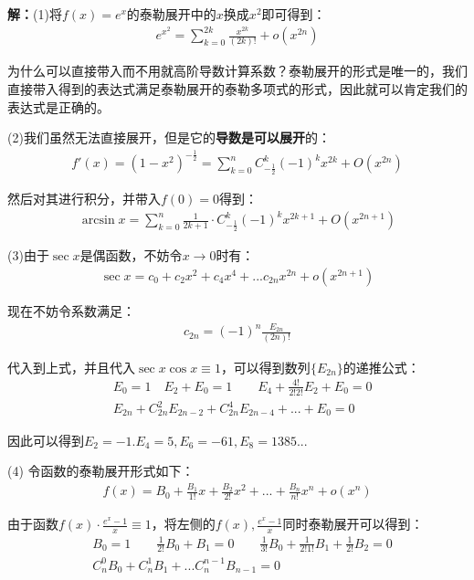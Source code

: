 \documentclass{ctexart}
\let\oldtextbf\textbf %
\renewcommand{\textbf}[1]{\textcolor{btex}{\oldtextbf{#1}}} %
\begin{document}
\textbf{解：}(1)将$f(x)=e^x$的泰勒展开中的$x$换成$x^2$即可得到：
\begin{align*}
    e^{x^2}=\sum_{k=0}^{2k}\frac{x^{2k}}{(2k)!}+o(x^{2n})
\end{align*}

为什么可以直接带入而不用就高阶导数计算系数？泰勒展开的形式是唯一的，我们直接带入得到的表达式满足泰勒展开的泰勒多项式的形式，因此就可以肯定我们的表达式是正确的。

(2)我们虽然无法直接展开，但是它的\textbf{导数是可以展开}的：
\begin{align*}
    f'(x)=(1-x^2)^{-\frac{1}{2}}=\sum_{k=0}^{n} C_{-\frac{1}{2}}^k (-1)^kx^{2k}+O(x^{2n})
\end{align*}

然后对其进行积分，并带入$f(0)=0$得到：
\begin{align*}
    \arcsin x=\sum_{k=0}^n\frac{1}{2k+1}\cdot C_{-\frac{1}{2}}^k (-1)^kx^{2k+1}+O(x^{2n+1})
\end{align*}

(3)由于$\sec x$是偶函数，不妨令$x\to 0$时有：
\begin{align*}
    \sec x=c_0+c_2x^2+c_4x^4+...c_{2n}x^{2n}+o(x^{2n+1})
\end{align*}

现在不妨令系数满足：
\begin{align*}
    c_{2n}=(-1)^n\frac{E_{2n}}{(2n)!}
\end{align*}

代入到上式，并且代入$\sec x\cos x\equiv 1$，可以得到数列$\{E_{2n}\}$的递推公式：
\begin{align*}
    & E_0=1\quad E_{2}+E_{0}=1\qquad E_4+\frac{4!}{2!2!}E_2+E_0=0\\
    &E_{2n}+C_{2n}^2 E_{2n-2}+C_{2n}^4E_{2n-4}+...+E_0=0
\end{align*}

因此可以得到$E_2=-1.E_4=5,E_6=-61,E_8=1385...$

(4) 令函数的泰勒展开形式如下：
\begin{align*}
    f(x)=B_0+\frac{B_1}{1!}x+\frac{B_2}{2!}x^2+...+\frac{B_n}{n!}x^n+o(x^n)
\end{align*}

由于函数$f(x)\cdot\frac{e^x-1}{x}\equiv 1$，将左侧的$f(x),\frac{e^x-1}{x}$同时泰勒展开可以得到：
\begin{align*}
    &B_0=1\qquad \frac{1}{2!}B_0+B_1=0\qquad\frac{1}{3!}B_0+\frac{1}{2!1!}B_1+\frac{1}{2!}B_2=0\\
    &C_n^0 B_0+C_n^1 B_1+...C_n^{n-1}B_{n-1}=0
\end{align*}
\end{document}
